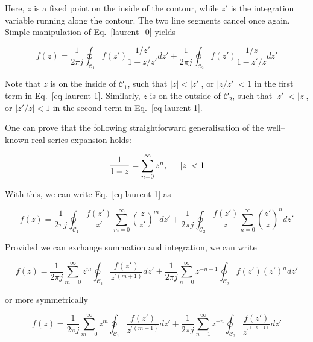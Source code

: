Here, $z$ is a fixed point on the inside of the contour, while $z'$ is the
integration variable running along the contour. The two line segments cancel
once again. Simple manipulation of Eq.~\ref{laurent_0} yields

\begin{equation}
f(z)=\frac{1}{2 \pi j }\oint_{\mathcal{C}_1} f(z') \frac{1 / z'} {1-z / z'} dz'
+ \frac{1}{2 \pi j }\oint_{\mathcal{C}_2} f(z') \frac{1 / z} {1 - z' / z} dz'
\label{eq-laurent-1}
\end{equation} 

Note that $z$ is on the inside of $\mathcal{C}_1$, such that $| z | < |z'| $, or
$ |z / z' | < 1$ in the first term in Eq.~\ref{eq-laurent-1}. Similarly, $z$ is
on the outside of $\mathcal{C}_2$, such that $|z'| < | z | $, or $ |z'  / z| <
1$ in the second term in Eq.~\ref{eq-laurent-1}.

One can prove that the following straightforward generalisation of the
well--known real series expansion holds:

\begin{equation}
\frac{1}{1-z} = \sum_{n=0}^\infty z^n, \hspace{.5cm} |z| < 1
\end{equation}

With this, we can write Eq.~\ref{eq-laurent-1} as

\begin{equation}
f(z)=\frac{1}{2 \pi j }\oint_{\mathcal{C}_1} \frac{f(z')}{z'}
\sum_{m=0}^{\infty} \left( \frac{z}{z'}\right)^m dz' + \frac{1}{2 \pi j
}\oint_{\mathcal{C}_2} \frac{f(z')}{z} \sum_{n=0}^{\infty}
\left(\frac{z'}{z}\right)^n dz'
\end{equation} 

Provided we can exchange summation and integration, we can write

\begin{equation}
f(z)=\frac{1}{2 \pi j } \sum_{m=0}^{\infty} z^m \oint_{\mathcal{C}_1}
\frac{f(z')}{z^{\prime (m+1)}} dz' + \frac{1}{2 \pi j } \sum_{n=0}^{\infty} z ^
{-n-1} \oint_{\mathcal{C}_2}  {f(z')}  (z')^ n dz'
\end{equation} 

or more symmetrically

\begin{equation}
f(z)=\frac{1}{2 \pi j } \sum_{m=0}^{\infty} z^m \oint_{\mathcal{C}_1}
\frac{f(z')}{z^{\prime (m+1)}} dz' + \frac{1}{2 \pi j } \sum_{n=1}^{\infty} z ^
{-n} \oint_{\mathcal{C}_2}  \frac{f(z')}{z^{\prime^ {(-n+1)}}} dz'
\label{eq-laurent-int}
\end{equation} 

